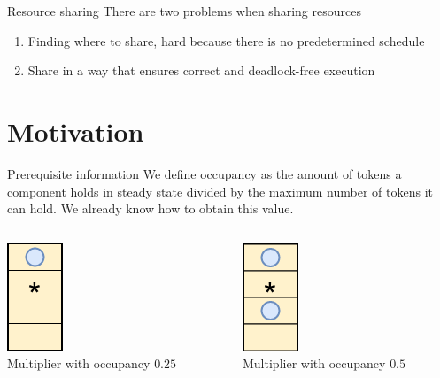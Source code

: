 \documentclass{beamer}
\begin{document}
\begin{frame}{Resource sharing}
    There are two problems when sharing resources
    \begin{enumerate}
        \item Finding where to share, hard because there is no predetermined schedule
        \item Share in a way that ensures correct and deadlock-free execution
    \end{enumerate}
\end{frame}
\section{Motivation}
\begin{frame}{Prerequisite information}
    We define occupancy as the amount of tokens a component holds in steady state divided by the maximum number of tokens it can hold. We already know how to obtain this value.\footnotemark
    \begin{columns}[T]
    \begin{column}{0.45\textwidth}
        \begin{center}
      \includegraphics[scale=0.25]{occupancy_25.png} \\
                Multiplier with occupancy $0.25$ 
    \end{center}    \end{column}
    \begin{column}{0.45\textwidth}
 \begin{center}
      \includegraphics[scale=0.25]{occupancy_50.png} \\
        Multiplier with occupancy $0.5$ 
    \end{center}
    \end{column}
  \end{columns}
\end{frame}
\end{document}
